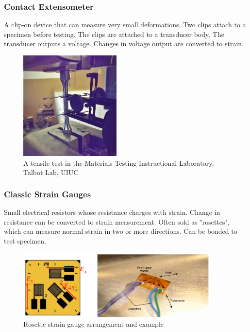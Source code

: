 \subsubsection{Contact Extensometer}

A clip-on device that can measure very small deformations. Two clips attach to a specimen before testing. The clips are attached to a transducer body. The transducer outputs a voltage. Changes in voltage output are converted to strain.

\clearpage

\begin{figure}[!h]
\centering
\includegraphics[angle=0, width=2in]{Strain-Figures/extensometer.jpg}
\vspace{-2mm}
\caption{\small A tensile test in the Materials Testing Instructional Laboratory, Talbot Lab, UIUC}
\vspace{-3mm}
\label{Fig:extensometer}
\end{figure}

\subsubsection{Classic Strain Gauges}

Small electrical resistors whose resistance charges with strain. Change in resistance can be converted to strain measurement. Often sold as "rosettes", which can measure normal strain in two or more directions. Can be bonded to test specimen.

\begin{figure}[!h]
\centering
\includegraphics[angle=0, width=4in]{Strain-Figures/strainGauge.png}
\vspace{-2mm}
\caption{\small Rosette strain gauge arrangement and example}
\vspace{-3mm}
\label{Fig:StrainGauge}
\end{figure}

